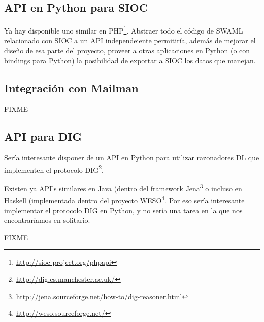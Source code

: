 \subsection*{API en Python para SIOC}

Ya hay disponible uno similar en PHP\footnote{\url{http://sioc-project.org/phpapi}}. 
Abstraer todo el código de SWAML relacionado con SIOC a un API independeiente permitiría,
además de mejorar el diseño de esa parte del proyecto, proveer a otras aplicaciones 
en Python (o con bindings para Python) la posibilidad de exportar a SIOC los datos 
que manejan.

\subsection*{Integración con Mailman}

FIXME

\subsection*{API para DIG}

Sería interesante disponer de un API en Python para utilizar razonadores DL que implementen 
el protocolo DIG\footnote{\url{http://dig.cs.manchester.ac.uk/}}. 

Existen ya API's similares en Java (dentro del framework
Jena\footnote{\url{http://jena.sourceforge.net/how-to/dig-reasoner.html}} o incluso en Haskell 
(implementada dentro del proyecto WESO\footnote{\url{http://weso.sourceforge.net/}}. Por eso 
sería interesante implementar el protocolo DIG en Python, y no sería una tarea
en la que nos encontraríamos en solitario\cite{PythonOWL}.

FIXME

